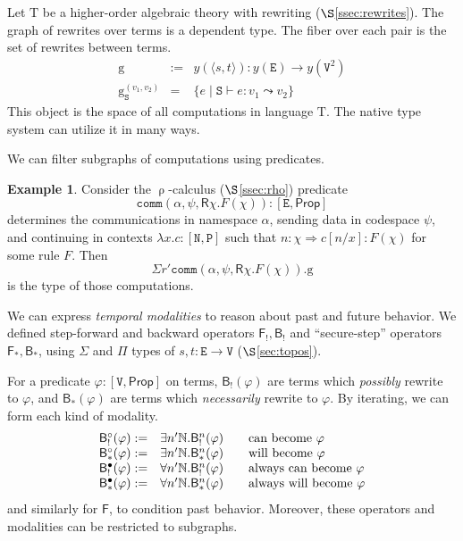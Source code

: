\documentclass[conference]{IEEEtran}
\theoremstyle{definition}
\newtheorem{example}[theorem]{Example}
\newcommand{\msf}[1]{\mathsf{#1}}
\newcommand{\mbb}[1]{\mathbb{#1}}
\newcommand{\mrm}[1]{\mathrm{#1}}
\newcommand{\mtt}[1]{\mathtt{#1}}
\newcommand{\ra}{\Rightarrow}
\newcommand{\T}{\mrm{T}}
\newcommand{\Prop}{\msf{Prop}}
\newcommand{\tts}{\mtt{S}}
\newcommand{\N}{\mtt{N}}
\newcommand{\PP}{\mtt{P}}
\begin{document}
Let $\T$ be a higher-order algebraic theory with rewriting ($\S$\ref{ssec:rewrites}). The graph of rewrites over terms is a dependent type. The fiber over each pair is the set of rewrites between terms.
\[\begin{array}{lcl}
    \mrm{g} & := & y(\langle s,t\rangle): y(\mtt{E})\to y(\mtt{V}^2)\\
    \mrm{g}_\tts^{(v_1,v_2)} & = & \{e \;|\; \tts\vdash e:v_1 \leadsto v_2\}
\end{array}\]
This object is the space of all computations in language $\T$. The native type system can utilize it in many ways.

We can filter subgraphs of computations using predicates.
\begin{example}
    Consider the $\uprho$-calculus ($\S$\ref{ssec:rho}) predicate
    \[\mtt{comm}(\alpha,\psi,\msf{R}\chi.F(\chi)):[\mtt{E},\Prop]\]
    determines the communications in namespace $\alpha$, sending data in codespace $\psi$, and continuing in contexts $\lambda x.c:[\N,\PP]$ such that $n:\chi\ra c[n/x]:F(\chi)$ for some rule $F$. Then 
    \[\Sigma r'\mtt{comm}(\alpha,\psi,\msf{R}\chi.F(\chi)).\mrm{g}\]
    is the type of those computations.
\end{example}

We can express \textit{temporal modalities} to reason about past and future behavior. We defined step-forward and backward operators $\msf{F}_!,\msf{B}_!$ and ``secure-step'' operators $\msf{F}_*,\msf{B}_*$, using $\Sigma$ and $\Pi$ types of $s,t:\mtt{E}\to \mtt{V}$ ($\S$\ref{sec:topos}).

For a predicate $\varphi:[\mtt{V},\Prop]$ on terms, $\msf{B}_!(\varphi)$ are terms which \textit{possibly} rewrite to $\varphi$, and $\msf{B}_*(\varphi)$ are terms which \textit{necessarily} rewrite to $\varphi$. By iterating, we can form each kind of modality.
\[\begin{array}{ll@{\qquad}l}
    \msf{B}_!^\circ(\varphi) := & \exists n'\mbb{N}.\msf{B}_!^n(\varphi) & \text{can become } \varphi\\
    \msf{B}_*^\circ(\varphi) := & \exists n'\mbb{N}.\msf{B}_*^n(\varphi) & \text{will become } \varphi\\
    \msf{B}_!^\bullet(\varphi) := & \forall n'\mbb{N}.\msf{B}_!^n(\varphi) & \text{always can become } \varphi\\
    \msf{B}_*^\bullet(\varphi) := & \forall n'\mbb{N}.\msf{B}_*^n(\varphi) & \text{always will become } \varphi
\end{array}\]
and similarly for $\msf{F}$, to condition past behavior. Moreover, these operators and modalities can be restricted to subgraphs.
\end{document}
